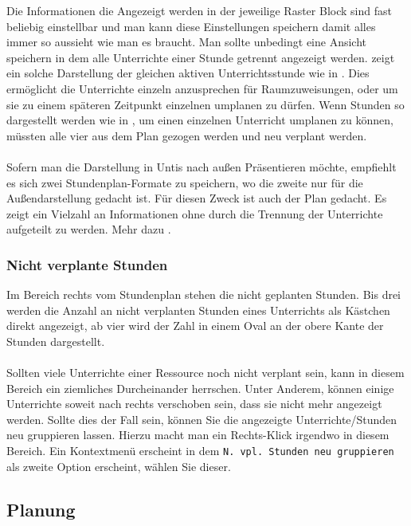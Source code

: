 \noindent
Die Informationen die Angezeigt werden in der jeweilige Raster Block sind fast beliebig einstellbar und man kann diese Einstellungen speichern damit alles immer so aussieht wie man es braucht. Man sollte unbedingt eine Ansicht speichern in dem alle Unterrichte einer Stunde getrennt angezeigt werden.  zeigt ein solche Darstellung der gleichen aktiven Unterrichtsstunde wie in . Dies ermöglicht die Unterrichte einzeln anzusprechen für Raumzuweisungen, oder um sie zu einem späteren Zeitpunkt einzelnen umplanen zu dürfen. Wenn Stunden so dargestellt werden wie in , um einen einzelnen Unterricht umplanen zu können, müssten alle vier aus dem Plan gezogen werden und neu verplant werden.\\
\\
Sofern man die Darstellung in Untis nach außen Präsentieren möchte, empfiehlt es sich zwei Stundenplan-Formate zu speichern, wo die zweite nur für die Außendarstellung gedacht ist. Für diesen Zweck ist auch der Plan  gedacht. Es zeigt ein Vielzahl an Informationen ohne durch die Trennung der Unterrichte aufgeteilt zu werden. Mehr dazu .

\subsubsection{Nicht verplante Stunden}

Im Bereich rechts vom Stundenplan stehen die nicht geplanten Stunden. Bis drei werden die Anzahl an nicht verplanten Stunden eines Unterrichts als Kästchen direkt angezeigt, ab vier wird der Zahl in einem Oval an der obere Kante der Stunden dargestellt.\\
\\
Sollten viele Unterrichte einer Ressource noch nicht verplant sein, kann in diesem Bereich ein ziemliches Durcheinander herrschen. Unter Anderem, können einige Unterrichte soweit nach rechts verschoben sein, dass sie nicht mehr angezeigt werden. Sollte dies der Fall sein, können Sie die angezeigte Unterrichte/Stunden neu gruppieren lassen. Hierzu macht man ein Rechts-Klick irgendwo in diesem Bereich. Ein Kontextmenü erscheint in dem \texttt{N. vpl. Stunden neu gruppieren} als zweite Option erscheint, wählen Sie dieser.

\subsection{Planung}
\label{sec:manuelle-planung}

